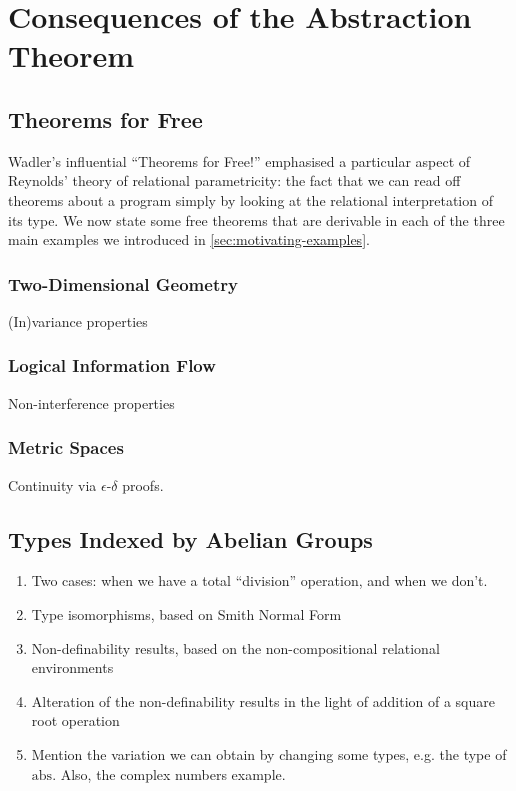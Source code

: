 \section{Consequences of the Abstraction Theorem}
\label{sec:instantiations}


\subsection{Theorems for Free}
\label{sec:theorems-for-free}

Wadler's influential ``Theorems for Free!''  \cite{wadler89theorems}
emphasised a particular aspect of Reynolds' theory of relational
parametricity: the fact that we can read off theorems about a program
simply by looking at the relational interpretation of its type. We now
state some free theorems that are derivable in each of the three main
examples we introduced in \autoref{sec:motivating-examples}.

\subsubsection{Two-Dimensional Geometry}
\label{sec:geometry-consequences}

(In)variance properties

\subsubsection{Logical Information Flow}
\label{sec:information-flow-consequences}

Non-interference properties

\subsubsection{Metric Spaces}
\label{sec:metric-space-consequences}

Continuity via $\epsilon$-$\delta$ proofs.

\subsection{Types Indexed by Abelian Groups}
\label{sec:types-indexed-abelian-groups}

\begin{enumerate}
\item Two cases: when we have a total ``division'' operation, and when
  we don't.
\item Type isomorphisms, based on Smith Normal Form
\item Non-definability results, based on the non-compositional
  relational environments
\item Alteration of the non-definability results in the light of
  addition of a square root operation
\item Mention the variation we can obtain by changing some types,
  e.g. the type of $\mathrm{abs}$. Also, the complex numbers example.
\end{enumerate}




